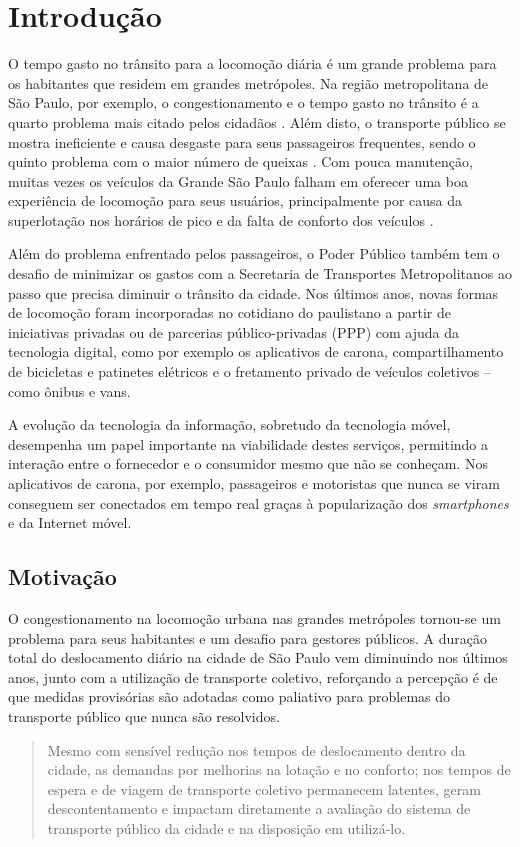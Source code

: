 \chapter{Introdução}
O tempo gasto no trânsito para a locomoção diária é um grande problema para os habitantes que residem em grandes metrópoles. Na região metropolitana de São Paulo, por exemplo, o congestionamento e o tempo gasto no trânsito é a quarto problema mais citado pelos cidadãos \cite{viveremsp}. Além disto, o transporte público se mostra ineficiente e causa desgaste para seus passageiros frequentes, sendo o quinto problema com o maior número de queixas \cite{mobilize}. Com pouca manutenção, muitas vezes os veículos da Grande São Paulo falham em oferecer uma boa experiência de locomoção para seus usuários, principalmente por causa da superlotação nos horários de pico e da falta de conforto dos veículos \cite{viveremsp}.

Além do problema enfrentado pelos passageiros, o Poder Público também tem o desafio de minimizar os gastos com a Secretaria de Transportes Metropolitanos ao passo que precisa diminuir o trânsito da cidade. Nos últimos anos, novas formas de locomoção foram incorporadas no cotidiano do paulistano a partir de iniciativas privadas ou de parcerias público-privadas (PPP) com ajuda da tecnologia digital, como por exemplo os aplicativos de carona, compartilhamento de bicicletas e patinetes elétricos e o fretamento privado de veículos coletivos -- como ônibus e vans. 

A evolução da tecnologia da informação, sobretudo da tecnologia móvel, desempenha um papel importante na viabilidade destes serviços, permitindo a interação entre o fornecedor e o consumidor mesmo que não se conheçam. Nos aplicativos de carona, por exemplo, passageiros e motoristas que nunca se viram conseguem ser conectados em tempo real graças à popularização dos \emph{smartphones} e da Internet móvel. 

\section{Motivação}

O congestionamento na locomoção urbana nas grandes metrópoles tornou-se um problema para seus habitantes e um desafio para gestores públicos. A duração total do deslocamento diário na cidade de São Paulo vem diminuindo nos últimos anos, junto com a utilização de transporte coletivo, reforçando a percepção é de que medidas provisórias são adotadas como paliativo para problemas do transporte público que nunca são resolvidos.
\begin{quote}
Mesmo com sensível redução nos tempos de deslocamento dentro da cidade, as demandas por melhorias na lotação e no conforto; nos tempos de espera e de viagem de transporte coletivo permanecem latentes, geram descontentamento e impactam diretamente a avaliação do sistema de transporte público da cidade e na disposição em utilizá-lo.
\end{quote}

